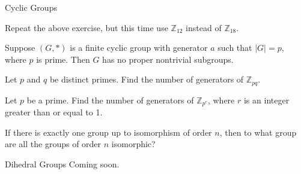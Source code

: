 \begin{section}{Cyclic Groups}
\begin{exercise}
Repeat the above exercise, but this time use $\mathbb{Z}_{12}$ instead of $\mathbb{Z}_{18}$.
\end{exercise}

\begin{corollary}
Suppose $(G,*)$ is a finite cyclic group with generator $a$ such that $|G|=p$, where $p$ is prime. Then $G$ has no proper nontrivial subgroups.
\end{corollary}

\begin{problem}
Let $p$ and $q$ be distinct primes. Find the number of generators of $\mathbb{Z}_{pq}$.
\end{problem}

\begin{problem}
Let $p$ be a prime. Find the number of generators of $\mathbb{Z}_{p^r}$, where $r$ is an integer greater than or equal to 1.
\end{problem}

\begin{problem}
If there is exactly one group up to isomorphism of order $n$, then to what group are all the groups of order $n$ isomorphic?
\end{problem}

\end{section}

\begin{section}{Dihedral Groups}
Coming soon.
\end{section}

